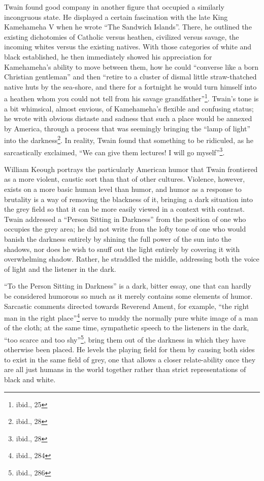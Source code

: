 Twain found good company in another figure that occupied a similarly incongruous
state. He displayed a certain fascination with the late King Kamehameha V when
he wrote ``The Sandwich Islands''. There, he outlined the existing dichotomies
of Catholic versus heathen, civilized versus savage, the incoming whites versus
the existing natives. With those categories of white and black established, he
then immediately showed his appreciation for Kamehameha's ability to move
between them, how he could ``converse like a born Christian gentleman'' and then
``retire to a cluster of dismal little straw-thatched native huts by the
sea-shore, and there for a fortnight he would turn himself into a heathen whom
you could not tell from his savage grandfather''\footnote{ibid., 25}.  Twain's
tone is a bit whimsical, almost envious, of Kamehameha's flexible and confusing
status; he wrote with obvious distaste and sadness that such a place would be
annexed by America, through a process that was seemingly bringing the ``lamp of
light'' into the darkness\footnote{ibid., 28}. In reality, Twain found that
something to be ridiculed, as he sarcastically exclaimed, ``We can give them
lectures! I will go myself''\footnote{ibid., 28}.

William Keough portrays the particularly American humor that Twain frontiered as
a more violent, caustic sort than that of other cultures. Violence, however,
exists on a more basic human level than humor, and humor as a response to
brutality is a way of removing the blackness of it, bringing a dark situation
into the grey field so that it can be more easily viewed in a context with
contrast. Twain addressed a ``Person Sitting in Darkness'' from the position of
one who occupies the grey area; he did not write from the lofty tone of one who
would banish the darkness entirely by shining the full power of the sun into the
shadows, nor does he wish to snuff out the light entirely by covering it with
overwhelming shadow. Rather, he straddled the middle, addressing both the voice
of light and the listener in the dark.

``To the Person Sitting in Darkness'' is a dark, bitter essay, one that can
hardly be considered humorous so much as it merely contains some elements of
humor. Sarcastic comments directed towards Reverend Ament, for example, ``the
right man in the right place''\footnote{ibid., 284} serve to muddy the normally
pure white image of a man of the cloth; at the same time, sympathetic speech to
the listeners in the dark, ``too scarce and too shy''\footnote{ibid., 286},
bring them out of the darkness in which they have otherwise been placed. He
levels the playing field for them by causing both sides to exist in the same
field of grey, one that allows a closer relate-ability once they are all just
humans in the world together rather than strict representations of black and
white.

